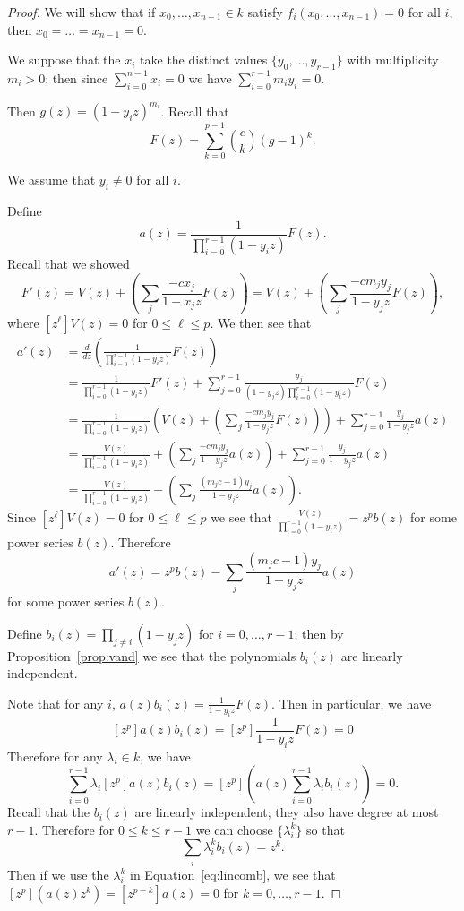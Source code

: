 \documentclass{amsart}
\numberwithin{equation}{section}
\theoremstyle{definition}
\begin{document}
\begin{proof} 

We will show that if $x_0,\dots,x_{n-1} \in k$ satisfy $f_i(x_0,\dots,x_{n-1})=0$ for all $i$, then $x_0=\dots=x_{n-1}=0$. 

We suppose that the $x_i$ take the distinct values $\{y_0,\dots,y_{r-1}\}$ with multiplicity $m_i>0$; then since $\sum_{i=0}^{n-1} x_i=0$ we have $\sum_{i=0}^{r-1} m_iy_i=0$. 

Then $g(z)=(1-y_iz)^{m_i}$. Recall that
\[
F(z)=\sum_{k=0}^{p-1} \binom{c}{k}(g-1)^k.
\]

We assume that $y_i \ne 0$ for all $i$.

Define
\[
a(z)=\frac{1}{\prod_{i=0}^{r-1}(1-y_iz)}F(z).
\]
Recall that we showed
\[
F'(z)=V(z)+\left(\sum_j \frac{-cx_j}{1-x_jz}F(z)\right)=V(z)+\left(\sum_j \frac{-cm_jy_j}{1-y_jz}F(z)\right),
\]
where $[z^\ell]V(z)=0$ for $0 \le \ell \le p$. We then see that
\begin{align*}
a'(z)&=\frac{d}{dz}\left(\frac{1}{\prod_{i=0}^{r-1}(1-y_iz)}F(z)\right)\\
&=\frac{1}{\prod_{i=0}^{r-1}(1-y_iz)}F'(z)+\sum_{j=0}^{r-1}\frac{y_j}{(1-y_jz)\prod_{i=0}^{r-1}(1-y_iz)}F(z)\\
&=\frac{1}{\prod_{i=0}^{r-1}(1-y_iz)}\left(V(z)+\left(\sum_j \frac{-cm_jy_j}{1-y_jz}F(z)\right)\right)+\sum_{j=0}^{r-1}\frac{y_j}{1-y_jz}a(z)\\
&=\frac{V(z)}{\prod_{i=0}^{r-1}(1-y_iz)}+\left(\sum_j \frac{-cm_jy_j}{1-y_jz}a(z)\right)+\sum_{j=0}^{r-1}\frac{y_j}{1-y_jz}a(z)\\
&=\frac{V(z)}{\prod_{i=0}^{r-1}(1-y_iz)}-\left(\sum_j \frac{(m_jc-1)y_j}{1-y_jz}a(z)\right).
\end{align*}
Since $[z^\ell]V(z)=0$ for $0 \le \ell \le p$ we see that $\frac{V(z)}{\prod_{i=0}^{r-1}(1-y_iz)}=z^pb(z)$ for some power series $b(z)$. Therefore
\[
a'(z)=z^pb(z)-\sum_j \frac{(m_jc-1)y_j}{1-y_jz}a(z)
\]
for some power series $b(z)$.

Define $b_i(z)=\prod_{j \ne i} (1-y_jz)$ for $i=0,\dots,r-1$; then by Proposition~\ref{prop:vand} we see that the polynomials $b_i(z)$ are linearly independent. 

Note that for any $i$, $a(z)b_i(z)=\frac{1}{1-y_iz}F(z)$. Then in particular, we have 
\[
[z^p]a(z)b_i(z)=[z^p]\frac{1}{1-y_iz}F(z)=0
\]
Therefore for any $\lambda_i \in k$, we have
\begin{equation}\label{eq:lincomb}
\sum_{i=0}^{r-1} \lambda_i[z^p]a(z)b_i(z)=[z^p]\left( a(z)\sum_{i=0}^{r-1}\lambda_ib_i(z)\right)=0.
\end{equation}
Recall that the $b_i(z)$ are linearly independent; they also have degree at most $r-1$. Therefore for $0 \le k \le r-1$ we can choose $\{\lambda_i^k\}$ so that 
\[
\sum_i\lambda_i^kb_i(z)=z^k.
\]
Then if we use the $\lambda_i^k$ in Equation~\ref{eq:lincomb}, we see that $[z^p](a(z)z^k)=[z^{p-k}]a(z)=0$ for $k=0,\dots,r-1$. 


\end{proof}
\end{document}
